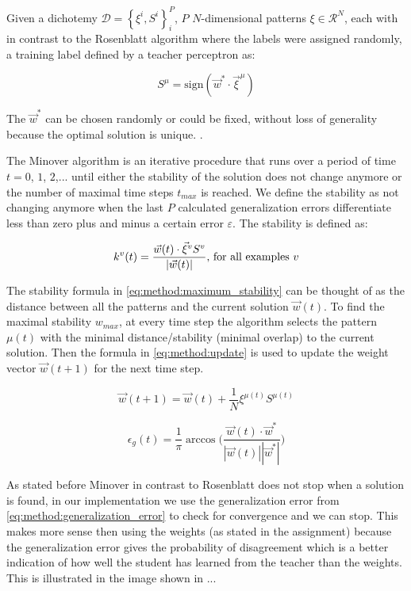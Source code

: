 Given a dichotemy $\mathcal{D} = \left\{\xi^i, S^i \right\}_{i}^{P}$, $P$ $N$-dimensional patterns $\xi \in \mathcal{R}^N$, each with in contrast to the Rosenblatt algorithm where the labels were assigned randomly, a training label defined by a teacher perceptron as:

\begin{equation}\label{eq:method:teacher_label}
	S^\mu = \text{sign}(\vec{w}^* \cdot {\vec{\xi}}^{\mu})
\end{equation}

The $\vec{w}^*$ can be chosen randomly or could be fixed, without loss of generality because the optimal solution is unique. .

The Minover algorithm is an iterative procedure that runs over a period of time $t = 0$, $1$, $2$,... until either the stability of the solution does not change anymore or the number of maximal time steps $t_{max}$ is reached. We define the stability as not changing anymore when the last $P$ calculated generalization errors differentiate less than zero plus and minus a certain error $\varepsilon$. The  stability is defined as: 

\begin{equation}\label{eq:method:maximum_stability}
\mathnormal{k}^v(t) = \frac{\vec{w}(t) \cdot \vec{\xi}^v S^v}{|\vec{w}(t)|} \text{, for all examples } v
\end{equation}

The stability formula in \eqref{eq:method:maximum_stability} can be thought of as the distance between all the patterns and the current solution $\vec{w}(t)$. To find the maximal stability $w_{max}$, at every time step the algorithm selects the pattern $\mu(t)$ with the minimal distance/stability (minimal overlap) to the current solution. Then the formula in \eqref{eq:method:update} is used to update the weight vector $\vec{w}(t + 1)$ for the next time step.

\begin{equation}\label{eq:method:update}
	\vec{w}(t + 1) = \vec{w}(t) + \frac{1}{N} \xi^{\mu(t)} S^{\mu(t)} 
\end{equation}

\begin{equation}\label{eq:method:generalization_error}
	\epsilon_g(t) = \frac{1}{\pi} \arccos \bigg(\frac{\vec{w}(t) \cdot \vec{w}^*}{|\vec{w}(t)| |\vec{w}^*|}\bigg)
\end{equation}

As stated before Minover in contrast to Rosenblatt does not stop when a solution is found, in our implementation we use the generalization error from \eqref{eq:method:generalization_error} to check for convergence and we can stop. This makes more sense then using the weights (as stated in the assignment) because the generalization error gives the probability of disagreement which is a better indication of how well the student has learned from the teacher than the weights. This is illustrated in the image shown in ...


